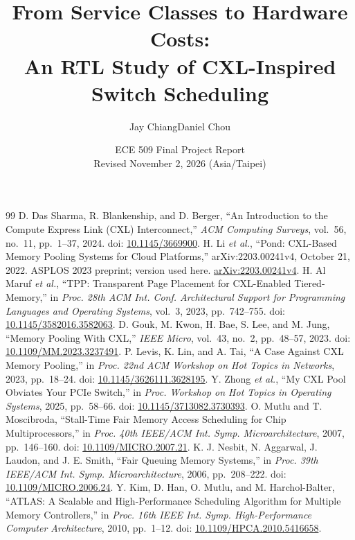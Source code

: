 \documentclass[10pt,letterpaper,twocolumn]{article}
\title{\vspace{-2em}\bfseries From Service Classes to Hardware Costs:\\ An RTL Study of CXL-Inspired Switch Scheduling}
\author{Jay Chiang\qquad Daniel Chou}
\date{\normalsize ECE 509 Final Project Report\\\small Revised November 2, 2026 (Asia/Taipei)}
\begin{document}
\maketitle

\clearpage

\begingroup\footnotesize\balance
\begin{thebibliography}{99}
 D. Das Sharma, R. Blankenship, and D. Berger, ``An Introduction to the Compute Express Link (CXL) Interconnect,'' \emph{ACM Computing Surveys}, vol.~56, no.~11, pp.~1--37, 2024. doi: \href{https://doi.org/10.1145/3669900}{10.1145/3669900}.
 H. Li \emph{et al.}, ``Pond: CXL-Based Memory Pooling Systems for Cloud Platforms,'' arXiv:2203.00241v4, October 21, 2022. ASPLOS 2023 preprint; version used here. \href{https://arxiv.org/abs/2203.00241v4}{arXiv:2203.00241v4}.
 H. Al Maruf \emph{et al.}, ``TPP: Transparent Page Placement for CXL-Enabled Tiered-Memory,'' in \emph{Proc. 28th ACM Int. Conf. Architectural Support for Programming Languages and Operating Systems}, vol.~3, 2023, pp.~742--755. doi: \href{https://doi.org/10.1145/3582016.3582063}{10.1145/3582016.3582063}.
 D. Gouk, M. Kwon, H. Bae, S. Lee, and M. Jung, ``Memory Pooling With CXL,'' \emph{IEEE Micro}, vol.~43, no.~2, pp.~48--57, 2023. doi: \href{https://doi.org/10.1109/MM.2023.3237491}{10.1109/MM.2023.3237491}.
 P. Levis, K. Lin, and A. Tai, ``A Case Against CXL Memory Pooling,'' in \emph{Proc. 22nd ACM Workshop on Hot Topics in Networks}, 2023, pp.~18--24. doi: \href{https://doi.org/10.1145/3626111.3628195}{10.1145/3626111.3628195}.
 Y. Zhong \emph{et al.}, ``My CXL Pool Obviates Your PCIe Switch,'' in \emph{Proc. Workshop on Hot Topics in Operating Systems}, 2025, pp.~58--66. doi: \href{https://doi.org/10.1145/3713082.3730393}{10.1145/3713082.3730393}.
 O. Mutlu and T. Moscibroda, ``Stall-Time Fair Memory Access Scheduling for Chip Multiprocessors,'' in \emph{Proc. 40th IEEE/ACM Int. Symp. Microarchitecture}, 2007, pp.~146--160. doi: \href{https://doi.org/10.1109/MICRO.2007.21}{10.1109/MICRO.2007.21}.
 K. J. Nesbit, N. Aggarwal, J. Laudon, and J. E. Smith, ``Fair Queuing Memory Systems,'' in \emph{Proc. 39th IEEE/ACM Int. Symp. Microarchitecture}, 2006, pp.~208--222. doi: \href{https://doi.org/10.1109/MICRO.2006.24}{10.1109/MICRO.2006.24}.
 Y. Kim, D. Han, O. Mutlu, and M. Harchol-Balter, ``ATLAS: A Scalable and High-Performance Scheduling Algorithm for Multiple Memory Controllers,'' in \emph{Proc. 16th IEEE Int. Symp. High-Performance Computer Architecture}, 2010, pp.~1--12. doi: \href{https://doi.org/10.1109/HPCA.2010.5416658}{10.1109/HPCA.2010.5416658}.

\end{thebibliography}
\end{document}
